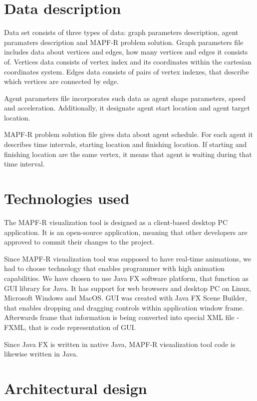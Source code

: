 \documentclass[thesis=B,english]{FITthesis}[2019/12/23]
\begin{document}
\section{Data description}

Data set consists of three types of data: graph parameters description, agent paramaters description and MAPF-R problem solution. Graph parameters file includes data about vertices and edges, how many vertices and edges it consists of. Vertices data consists of vertex index and its coordinates within the cartesian coordinates system. Edges data consists of pairs of vertex indexes, that describe which vertices are connected by edge.   

Agent parameters file incorporates such data as agent shape parameters, speed and acceleration. Additionally, it designate agent start location and agent target location.

MAPF-R problem solution file gives data about agent schedule. For each agent it describes time intervals, starting location and finishing location. If starting and finishing location are the same vertex, it means that agent is waiting during that time interval.

\section{Technologies used}

The MAPF-R visualization tool is designed as a client-based desktop PC application. It is an open-source application, meaning that other developers are approved to commit their changes to the project.

Since MAPF-R visualization tool was supposed to have real-time animations, we had to choose technology that enables programmer with high animation capabilities. We have chosen to use Java FX software platform, that function as GUI library for Java. It has support for web browsers and desktop PC on Linux, Microsoft Windows and MacOS.
GUI was created with Java FX Scene Builder, that enables dropping and dragging controls within application window frame. Afterwards frame that information is being converted into special XML file - FXML, that is code representation of GUI. 

Since Java FX is written in native Java, MAPF-R visualization tool code is likewise written in Java.

\section{Architectural design}
\end{document}
